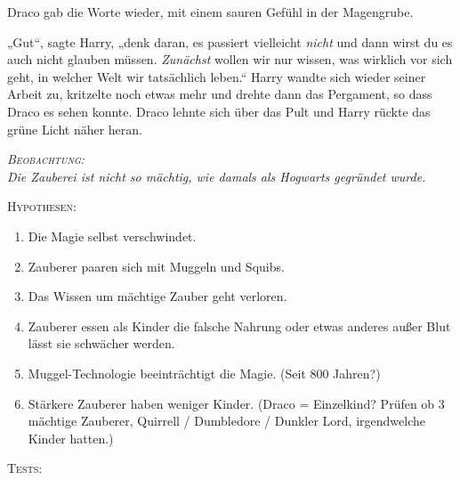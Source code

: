 Draco gab die Worte wieder, mit einem sauren Gefühl in der Magengrube.

„Gut“, sagte Harry, „denk daran, es passiert vielleicht \emph{nicht} und dann wirst du es auch nicht glauben müssen. \emph{Zunächst} wollen wir nur wissen, was wirklich vor sich geht, in welcher Welt wir tatsächlich leben.“ Harry wandte sich wieder seiner Arbeit zu, kritzelte noch etwas mehr und drehte dann das Pergament, so dass Draco es sehen konnte. Draco lehnte sich über das Pult und Harry rückte das grüne Licht näher heran.

\begin{center}\itshape
{\scshape Beobachtung:}\\
Die Zauberei ist nicht so mächtig, wie damals als Hogwarts gegründet wurde.

{\scshape Hypothesen:}
\begin{enumerate}[1.]\firmlist
\item Die Magie selbst verschwindet.
\item Zauberer paaren sich mit Muggeln und Squibs.
\item Das Wissen um mächtige Zauber geht verloren.
\item Zauberer essen als Kinder die falsche Nahrung oder etwas anderes außer Blut lässt sie schwächer werden.
\item Muggel-Technologie beeinträchtigt die Magie. (Seit 800 Jahren?)
\item Stärkere Zauberer haben weniger Kinder. (Draco = Einzelkind? Prüfen ob 3 mächtige Zauberer, Quirrell / Dumbledore / Dunkler Lord, irgendwelche Kinder hatten.)
\end{enumerate}
{\scshape Tests:}
\end{center}

